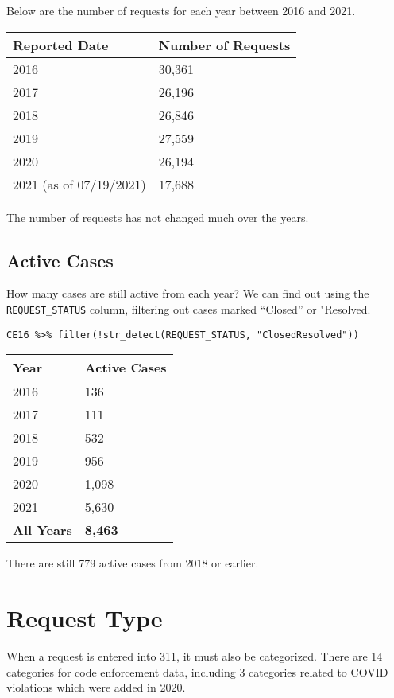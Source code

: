\documentclass[
]{book}
\begin{document}
Below are the number of requests for each year between 2016 and 2021.

\begin{longtable}[]{@{}ll@{}}
\toprule
Reported Date & Number of Requests \\
\midrule
\endhead
2016 & 30,361 \\
2017 & 26,196 \\
2018 & 26,846 \\
2019 & 27,559 \\
2020 & 26,194 \\
2021 (as of 07/19/2021) & 17,688 \\
\bottomrule
\end{longtable}

The number of requests has not changed much over the years.

\hypertarget{active-cases}{%
\subsection{Active Cases}\label{active-cases}}

How many cases are still active from each year? We can find out using the \texttt{REQUEST\_STATUS} column, filtering out cases marked ``Closed'' or "Resolved.

\texttt{CE16\ \%\textgreater{}\%\ filter(!str\_detect(REQUEST\_STATUS,\ "Closed\textbar{}Resolved"))}

\begin{longtable}[]{@{}ll@{}}
\toprule
Year & Active Cases \\
\midrule
\endhead
2016 & 136 \\
2017 & 111 \\
2018 & 532 \\
2019 & 956 \\
2020 & 1,098 \\
2021 & 5,630 \\
\textbf{All Years} & \textbf{8,463} \\
\bottomrule
\end{longtable}

There are still 779 active cases from 2018 or earlier.

\hypertarget{request-type}{%
\section{Request Type}\label{request-type}}

When a request is entered into 311, it must also be categorized. There are 14 categories for code enforcement data, including 3 categories related to COVID violations which were added in 2020.
\end{document}
